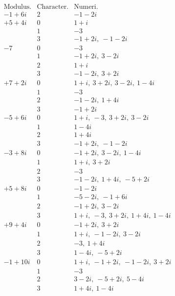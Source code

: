 %
\[
\begin{array}{r|c|l}
\text{Modulus.}&\text{Character.}&\text{Numeri.}\\\hline
-1+6i&2&-1-2i\\
+5+4i&0&1+i\\
&1&-3\\
&3&-1+2i,\ -1-2i\\
-7&0&-3\\
&1&-1+2i,\ 3-2i\\
&2&1+i\\
&3&-1-2i,\ 3+2i\\
+7+2i&0&1+i,\ 3+2i,\ 3-2i,\ 1-4i\\
&1&-3\\
&2&-1-2i,\ 1+4i\\
&3&-1+2i\\
-5+6i&0&1+i,\ -3,\ 3+2i,\ 3-2i\\
&1&1-4i\\
&2&1+4i\\
&3&-1+2i,\ -1-2i\\
-3+8i&0&-1+2i,\ 3-2i,\ 1-4i\\
&1&1+i,\ 3+2i\\
&2&-3\\
&3&-1-2i,\ 1+4i,\ -5+2i\\
+5+8i&0&-1-2i\\
&1&-5-2i,\ -1+6i\\
&2&-1+2i,\ 3-2i\\
&3&1+i,\ -3,\ 3+2i,\ 1+4i,\ 1-4i\\
+9+4i&0&-1+2i,\ 3+2i\\
&1&1+i,\ -1-2i,\ 3-2i\\
&2&-3,\ 1+4i\\
&3&1-4i,\ -5+2i\\
-1+10i&0&1+i,\ -1+2i,\ -1-2i,\ 3+2i\\
&1&-3\\
&2&3-2i,\ -5+2i,\ 5-4i\\
&3&1+4i,\ 1-4i
\end{array}
\]

